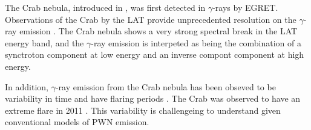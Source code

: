 The Crab nebula, introduced in , was first detected
in $\gamma$-rays by \ac{EGRET}.  Observations of the Crab by the
\ac{LAT} provide unprecedented resolution on the $\gamma$-ray emission
\cite{abdo_2010a_fermi-large}.  The Crab nebula shows a very strong
spectral break in the \ac{LAT} energy band, and the $\gamma$-ray emission
is interpeted as being the combination of a synctroton component at low
energy and an inverse compont component at high energy.

In addition, $\gamma$-ray emission from the Crab nebula has
been obseved to be variability in time and have flaring periods
\citep{abdo_2011a_gamma-ray-flares}.  The Crab was observed to have
an extreme flare in 2011 \citep{buehler_2012a_gamma-ray-activity}.
This variability is challengeing to understand given conventional models
of \ac{PWN} emission.

\subsubsection{\velax}

